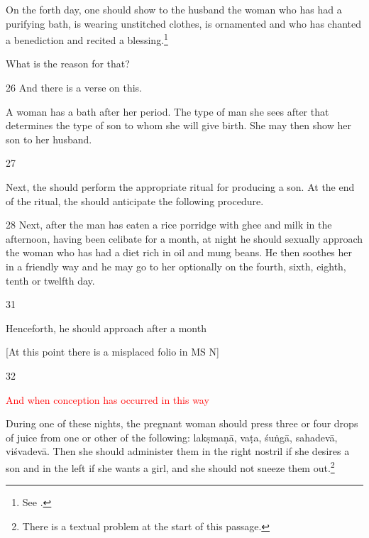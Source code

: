 \begin{translation}
On the forth day, one should  show to the husband the woman 
who has
had a purifying bath, is wearing unstitched clothes, is ornamented and who has
chanted a benediction and recited a blessing.\footnote{See \cite[58 and
    fn.\,167]{wuja-2023}.}
    
    What is the reason for that?
     
     
     \item[26]
     And there is a verse on this.
     
     \begin{sloka}
         
         A woman has a bath after her period.  The type of man she sees after 
         that determines the type of son to whom she will give birth. She may then 
         show her son to her husband.     
           
     \end{sloka}
        
        \item[27]
        
\begin{sloka}
            Next, the  should perform the appropriate 
            ritual 
        for producing a son.  At the end of the ritual, the  
        should anticipate the following procedure. 
 
\end{sloka}       

\item [28]
        Next, after the man has eaten a rice porridge with ghee and milk in the
afternoon, having been celibate for a month, at night he should sexually
approach the woman who has had a diet rich in oil and mung beans.  He then
soothes her in a friendly way and he may go to her optionally on the fourth, 
sixth, eighth, tenth or twelfth day. 
        
        
 \item [31]

Henceforth, he should approach after a month

[At this point there is a misplaced folio in MS N]
  
\item[32] 

\textcolor{red}{And when conception has occurred in this 
way}\q{\textcolor{red}{Problematic 
passage in the edition.}}

During one of these nights, the pregnant woman should press three or
four drops of juice from one or other of the following:
\gls{lakṣmaṇā}, \gls{vaṭa}, \gls{śuṅgā}, \gls{sahadevā},
\gls{viśvadevā}. Then she should administer them in the right nostril if she
desires a son and in the left if she wants a girl, and she should not
sneeze them out.\footnote{There is a textual problem at the start of this 
passage.}



\end{translation}
